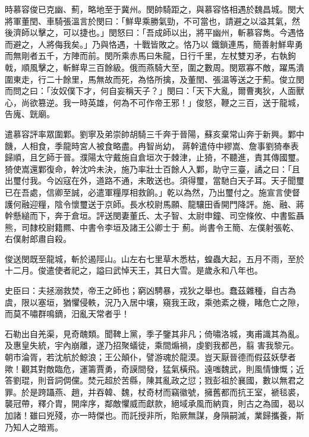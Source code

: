 \begin{pinyinscope}
 時慕容俊已克幽、薊，略地至于冀州。閔帥騎距之，與慕容恪相遇於魏昌城。閔大將軍董閏、車騎張溫言於閔曰：「鮮卑乘勝氣勁，不可當也，請避之以溢其氣，然後濟師以擊之，可以捷也。」閔怒曰：「吾成師以出，將平幽州，斬慕容雋。今遇恪而避之，人將侮我矣。」乃與恪遇，十戰皆敗之。恪乃以
 鐵鎖連馬，簡善射鮮卑勇而無剛者五千，方陣而前。閔所乘赤馬曰朱龍，日行千里，左杖雙刃矛，右執鉤戟，順風擊之，斬鮮卑三百餘級。俄而燕騎大至，圍之數周。閔眾寡不敵，躍馬潰圍東走，行二十餘里，馬無故而死，為恪所擒，及董閏、張溫等送之于薊。俊立閔而問之曰：「汝奴僕下才，何自妄稱天子？」閔曰：「天下大亂，爾曹夷狄，人面獸心，尚欲篡逆。我一時英雄，何為不可作帝王邪！」俊怒，鞭之三百，送于龍城，告廆、皝廟。



 遣慕容評率眾圍鄴。劉寧及弟崇帥胡騎三千奔于晉陽，蘇亥棄常山奔于新興。鄴中饑，人相食，季龍時宮人被食略盡。冉智尚幼，
 蔣幹遣侍中繆嵩、詹事劉猗奉表歸順，且乞師于晉。濮陽太守戴施自倉垣次于棘津，止猗，不聽進，責其傳國璽。猗使嵩還鄴復命，幹沈吟未決，施乃率壯士百餘人入鄴，助守三臺，譎之曰：「且出璽付我。今凶寇在外，道路不通，未敢送也。須得璽，當馳白天子耳。天子聞璽已在吾處，信卿至誠，必遣軍糧厚相救餉。」乾以為然，乃出璽付之。施宣言使督護何融迎糧，陰令懷璽送于京師。長水校尉馬願、龍驤田香開門降評。施、融、蔣幹懸縋而下，奔于倉垣。評送閔妻董氏、太子智、太尉申鐘、司空條攸、中書監聶熊，司隸校尉籍羆、中書令李垣及諸王公卿士于
 薊。尚書令王簡、左僕射張乾、右僕射郎肅自殺。



 俊送閔既至龍城，斬於遏陘山。山左右七里草木悉枯，蝗蟲大起，五月不雨，至於十二月。俊遣使者祀之，謚曰武悼天王，其日大雪。是歲永和八年也。



 史臣曰：夫拯溺救焚，帝王之師也；窮凶騁暴，戎狄之舉也。蠢茲雜種，自古為虞，限以塞垣，猶懼侵軼，況乃入居中壤，窺我王政，乘弛紊之機，睹危亡之隙，而莫不嘯群鳴鏑，汨亂天常者乎！



 石勒出自羌渠，見奇醜類。聞鞞上黨，季子鑒其非凡；倚嘯洛城，夷甫識其為亂。及惠皇失統，宇內崩離，遂乃招聚蟻徒，乘間煽禍，虔劉我都邑，翦
 害我黎元。朝市淪胥，若沈航於鯨浪；王公顛仆，譬游魂於龍漠。豈天厭晉德而假茲妖孽者歟！觀其對敵臨危，運籌賈勇，奇謨間發，猛氣橫飛。遠嗤魏武，則風情慷慨；近答劉琨，則音詞倜儻。焚元超於苦縣，陳其亂政之愆；戮彭祖於襄國，數以無君之罪。於是跨躡燕、趙，并吞韓、魏，杖奇材而竊徽號，擁舊都而抗王室，褫毯裘，襲冠帶，釋介胄，開庠序，鄰敵懼威而獻款，絕域承風而納貢，則古之為國，曷以加諸！雖曰兇殘，亦一時傑也。而託授非所，貽厥無謀，身隕嗣滅，業歸攜養，斯乃知人之暗焉。




\end{pinyinscope}
